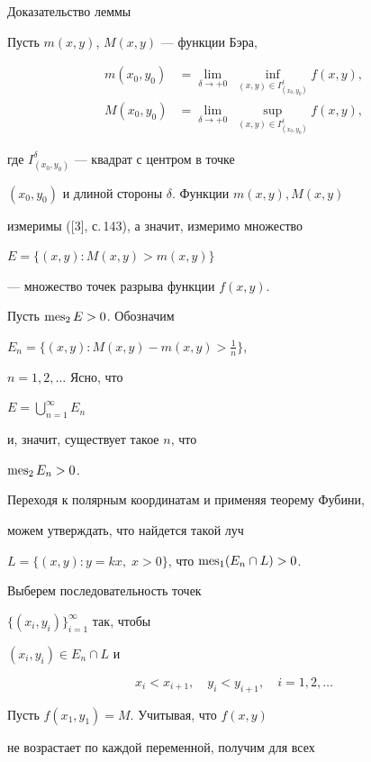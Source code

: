 \begin{pf*}{Доказательство леммы}


Пусть $m(x,y)$, $M(x,y)$ --- функции Бэра,


\begin{align*}


m(x_0,y_0) &= \lim_{\delta \to +0}\;


\inf_{(x,y) \in I_{(x_0,y_0)}^{\delta}} f(x,y),\\


M(x_0,y_0) &= \lim_{\delta \to +0}\;


\sup_{(x,y) \in I_{(x_0,y_0)}^{\delta}} f(x,y),


\end{align*}


где $I_{(x_0,y_0)}^{\delta}$ --- квадрат с центром в точке


$(x_0,y_0)$ и длиной стороны $\delta$. Функции $m(x,y), M(x,y)$


измеримы ([3], с.\,143), а значит, измеримо множество


$E = \{(x,y): M(x,y)>m(x,y)\}$


--- множество точек разрыва функции $f(x,y)$.


Пусть $\operatorname{mes}_2 E >0$. Обозначим


$E_n=\{(x,y):M(x,y)-m(x,y) > \frac{1}{n} \}$,


$n=1,2,\dotsc$ Ясно, что


$E=\bigcup\limits_{n=1}^{\infty}E_n$


и, значит, существует такое $n$, что


$\operatorname{mes}_2E_n>0$.





Переходя к полярным координатам и применяя теорему Фубини,


можем утверждать, что найдется такой луч


$L=\{(x,y):y=kx,\;x>0\}$, что $\operatorname{mes}_1(E_n \cap L)>0$.


Выберем последовательность точек


$\{(x_i,y_i)\}_{i=1}^{\infty}$ так, чтобы


$(x_i,y_i) \in E_n \cap L$ и


$$


x_i<x_{i+1}, \quad y_i<y_{i+1}, \quad i=1,2,\dotsc


$$


Пусть $f(x_1,y_1) = M$. Учитывая, что $f(x,y)$


не возрастает по каждой переменной, получим для всех



\end{pf*}
